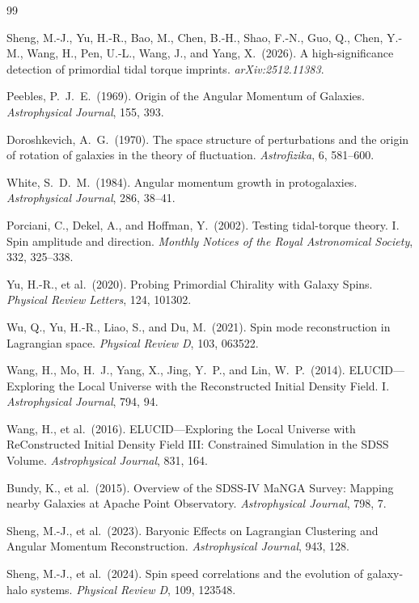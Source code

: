 \documentclass[11pt]{article}
\begin{document}
\begin{thebibliography}{99}

Sheng, M.-J., Yu, H.-R., Bao, M., Chen, B.-H., Shao, F.-N., Guo, Q., Chen, Y.-M., Wang, H., Pen, U.-L., Wang, J., and Yang, X.\ (2026). A high-significance detection of primordial tidal torque imprints. \textit{arXiv:2512.11383}.

Peebles, P.\ J.\ E.\ (1969). Origin of the Angular Momentum of Galaxies. \textit{Astrophysical Journal}, 155, 393.

Doroshkevich, A.\ G.\ (1970). The space structure of perturbations and the origin of rotation of galaxies in the theory of fluctuation. \textit{Astrofizika}, 6, 581--600.

White, S.\ D.\ M.\ (1984). Angular momentum growth in protogalaxies. \textit{Astrophysical Journal}, 286, 38--41.

Porciani, C., Dekel, A., and Hoffman, Y.\ (2002). Testing tidal-torque theory. I. Spin amplitude and direction. \textit{Monthly Notices of the Royal Astronomical Society}, 332, 325--338.

Yu, H.-R., et al.\ (2020). Probing Primordial Chirality with Galaxy Spins. \textit{Physical Review Letters}, 124, 101302.

Wu, Q., Yu, H.-R., Liao, S., and Du, M.\ (2021). Spin mode reconstruction in Lagrangian space. \textit{Physical Review D}, 103, 063522.

Wang, H., Mo, H.\ J., Yang, X., Jing, Y.\ P., and Lin, W.\ P.\ (2014). ELUCID---Exploring the Local Universe with the Reconstructed Initial Density Field. I. \textit{Astrophysical Journal}, 794, 94.

Wang, H., et al.\ (2016). ELUCID---Exploring the Local Universe with ReConstructed Initial Density Field III: Constrained Simulation in the SDSS Volume. \textit{Astrophysical Journal}, 831, 164.

Bundy, K., et al.\ (2015). Overview of the SDSS-IV MaNGA Survey: Mapping nearby Galaxies at Apache Point Observatory. \textit{Astrophysical Journal}, 798, 7.

Sheng, M.-J., et al.\ (2023). Baryonic Effects on Lagrangian Clustering and Angular Momentum Reconstruction. \textit{Astrophysical Journal}, 943, 128.

Sheng, M.-J., et al.\ (2024). Spin speed correlations and the evolution of galaxy-halo systems. \textit{Physical Review D}, 109, 123548.


\end{thebibliography}
\end{document}
